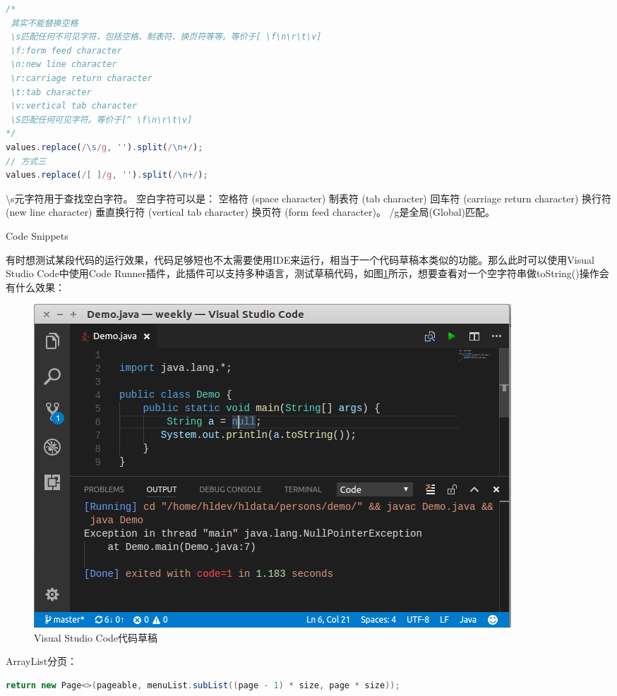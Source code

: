 \documentclass[12pt]{book}
\makeatletter
\numberwithin{dummy}{section}
\theoremstyle{ocrenumbox}
\theoremstyle{blacknumex}
\theoremstyle{blacknumbox}
\theoremstyle{ocrenum}
\renewcommand{\subsection}{\@startsection {subsection}{2}{\z@}
	{-3ex \@plus -0.1ex \@minus -.4ex}
	{0.5ex \@plus.2ex }
	{\normalfont\sffamily\bfseries}}
\makeatother
\begin{document}
\begin{lstlisting}[language=Javascript]
/*
 其实不能替换空格
 \s匹配任何不可见字符，包括空格、制表符、换页符等等。等价于[ \f\n\r\t\v]
 \f:form feed character
 \n:new line character
 \r:carriage return character
 \t:tab character
 \v:vertical tab character
 \S匹配任何可见字符。等价于[^ \f\n\r\t\v]
*/
values.replace(/\s/g, '').split(/\n+/);
// 方式三
values.replace(/[ ]/g, '').split(/\n+/);
\end{lstlisting}

\textbackslash{}s元字符用于查找空白字符。
空白字符可以是：
空格符 (space character)
制表符 (tab character)
回车符 (carriage return character)
换行符 (new line character)
垂直换行符 (vertical tab character)
换页符 (form feed character)。 /g是全局(Global)匹配。

\subsection{Code Snippets}

有时想测试某段代码的运行效果，代码足够短也不太需要使用IDE来运行，相当于一个代码草稿本类似的功能。那么此时可以使用Visual Studio Code中使用Code Runner插件，此插件可以支持多种语言，测试草稿代码，如图\ref{fig:visualstudiocodesnippet}所示，想要查看对一个空字符串做toString()操作会有什么效果：

\begin{figure}[htbp]
	\centering
	\includegraphics[scale=0.5]{visualstudiocodesnippet.png}
	\caption{Visual Studio Code代码草稿}
	\label{fig:visualstudiocodesnippet}
\end{figure}

ArrayList分页：

\begin{lstlisting}[language=Java]
return new Page<>(pageable, menuList.subList((page - 1) * size, page * size));
\end{lstlisting}
\end{document}
